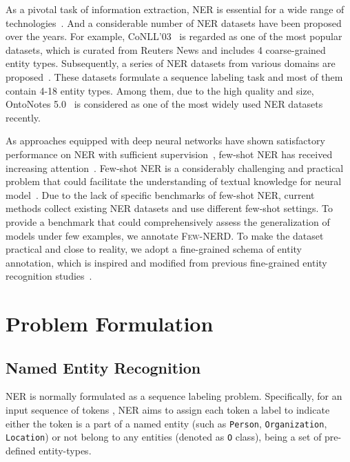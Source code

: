 \documentclass[11pt,a4paper, dvipsnames]{article}
\begin{document}
As a pivotal task of information extraction, NER is essential for a wide range of technologies~\cite{cui2019kbqa, li2019chinese, ding-etal-2019-event, shen2020modeling}. And a considerable number of NER datasets have been proposed over the years. For example, CoNLL'03~\cite{sang2003introduction} is regarded as one of the most popular datasets, which is curated from Reuters News and includes 4 coarse-grained entity types. Subsequently, a series of NER datasets from various domains are proposed~\cite{balasuriya2009named, ritter-etal-2011-named, weischedel2013ontonotes, stubbs2015annotating, derczynski2017results}. These datasets formulate a sequence labeling task and most of them contain 4-18 entity types. Among them, due to the high quality and size, OntoNotes 5.0~\cite{weischedel2013ontonotes} is considered as one of the most widely used NER datasets recently.

As approaches equipped with deep neural networks have shown satisfactory performance on NER with sufficient supervision~\cite{lample-etal-2016-neural, ma2016end}, few-shot NER has received increasing attention~\cite{hofer2018few, fritzler2019few, yang2020simple, li2020few}. Few-shot NER is a considerably challenging and practical problem that could facilitate the understanding of textual knowledge for neural model~\cite{huang2020few}. Due to the lack of specific benchmarks of few-shot NER, current methods collect existing NER datasets and use different few-shot settings. To provide a benchmark that could comprehensively assess the generalization of models under few examples, we annotate \textsc{Few-NERD}. To make the dataset practical and close to reality, we adopt a fine-grained schema of entity annotation, which is inspired and modified from previous fine-grained entity recognition studies~\cite{ling2012fine, gillick2014context, choi2018ultra, ringland2019nne}.




\section{Problem Formulation}
\subsection{Named Entity Recognition}

NER is normally formulated as a sequence labeling problem. Specifically, for an input sequence of tokens , NER aims to assign each token  a label  to indicate either the token is a part of a named entity (such as \texttt{Person}, \texttt{Organization}, \texttt{Location}) or not belong to any entities (denoted as \texttt{O} class),  being a set of pre-defined entity-types.
\end{document}
